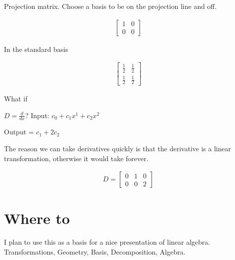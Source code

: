 \documentclass{article}
\begin{document}
Projection matrix. Choose a basis to be on the projection line and off.

\begin{align}
\begin{bmatrix}
1 & 0 \\
0 & 0
\end{bmatrix}
\end{align}

In the standard basis

\begin{align}
\begin{bmatrix}
\frac{1}{2} & \frac{1}{2} \\
\frac{1}{2} & \frac{1}{2}
\end{bmatrix}
\end{align}

What if

$D = \frac{d}{dx}$? Input: $c_0 + c_1x^1 + c_2x^2$

Output = $c_1 + 2c_2$

The reason we can take derivatives quickly is that the derivative is a linear transformation, otherwise it would take forever.

\begin{align}
D = 
\begin{bmatrix}
0 & 1 & 0 \\
0 & 0 & 2
\end{bmatrix}
\end{align}

\section{Where to}

I plan to use this as a basis for a nice presentation of linear algebra. Transformations, Geometry, Basis, Decomposition, Algebra.
\end{document}
